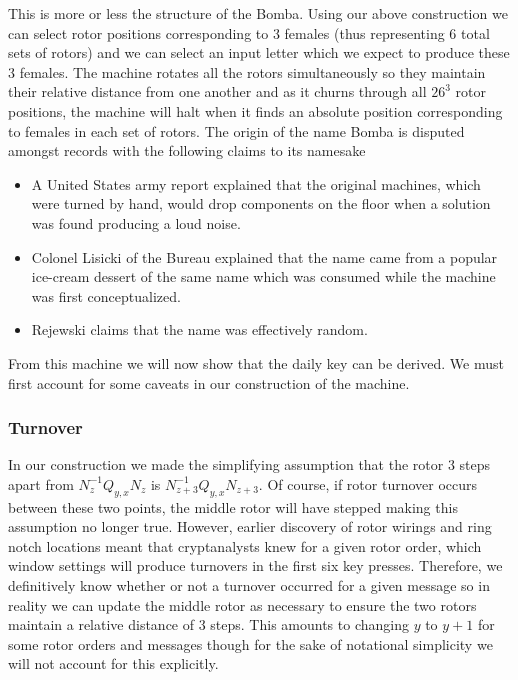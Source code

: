 \noindent This is more or less the structure of the Bomba. Using our
above construction we can select rotor positions corresponding to 3
females (thus representing 6 total sets of rotors) and we can select
an input letter which we expect to produce these 3 females. The
machine rotates all the rotors simultaneously so they maintain their
relative distance from one another and as it churns through all
$26^3$ rotor positions, the machine will halt when it finds an
absolute position corresponding to females in each set of rotors. The
origin of the name Bomba is disputed amongst records with the
following claims to its namesake
\begin{itemize}
	\item A United States army report explained that the original
	      machines, which were turned by hand, would drop components on the
	      floor when a solution was found producing a loud noise.
	\item Colonel Lisicki of the Bureau explained that
	      the name came from a popular ice-cream dessert of the same name
	      which was consumed while the machine was first conceptualized.
	\item Rejewski claims that the name was effectively random.
\end{itemize}
From this machine we will now show that the daily key can be derived.
We must first account for some caveats in our construction of the machine.

\subsubsection{Turnover}
In our construction we made the simplifying assumption that the rotor
3 steps apart from $N_{z}^{-1}Q_{y,x}N_{z}$ is
$N_{z+3}^{-1}Q_{y,x}N_{z+3}$. Of course, if rotor turnover occurs
between these two points, the middle rotor will have stepped making
this assumption no longer true. However, earlier discovery of rotor
wirings and ring notch locations meant that cryptanalysts knew for a
given rotor order, which window settings will produce turnovers in
the first six key presses. Therefore, we definitively know whether or
not a turnover occurred for a given message so in reality we can
update the middle rotor as necessary to ensure the two rotors
maintain a relative distance of 3 steps. This amounts to changing $y$
to $y+1$ for some rotor orders and messages though for the sake of
notational simplicity we will not account for this explicitly.
